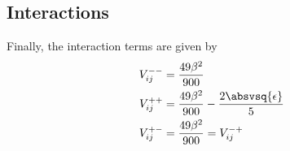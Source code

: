 
\subsection{Interactions}
Finally, the interaction terms are given by
\begin{align}
    V_{ij}^{--} &= \frac{49\beta^2}{900}\\
    V_{ij}^{++} &= \frac{49\beta^2}{900} - \frac{2\absvsq{\epsilon}}{5} \\
    V_{ij}^{+-} &= \frac{49\beta^2}{900} = V_{ij}^{-+}
\end{align}
